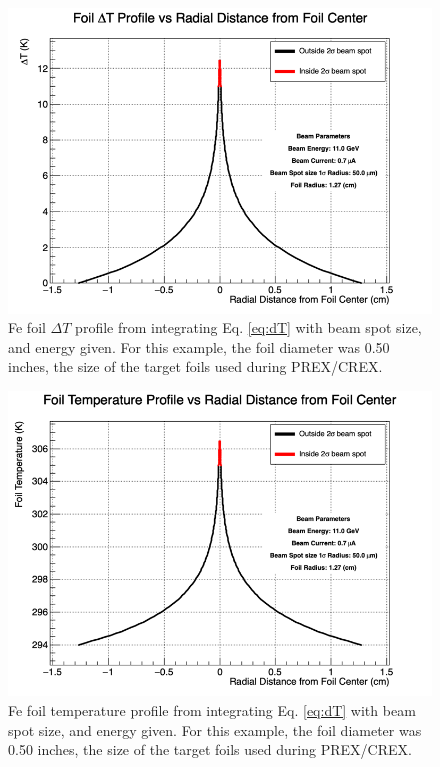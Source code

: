 \documentclass[12pt]{article}
\begin{document}
\begin{figure}[h]
\centering
\includegraphics[width=0.9\linewidth]{FoilHeatingdT.png}
\caption{\label{fig:foilheating}Fe foil $\Delta T$ profile from integrating Eq. \ref{eq:dT} with beam spot size, and energy given. For this example, the foil diameter was 0.50 inches, the size of the target foils used during PREX/CREX.}
\end{figure}
\begin{figure}[h]
\centering
\includegraphics[width=0.9\linewidth]{FoilHeatingT.png}
\caption{\label{fig:foilheatingT}Fe foil temperature profile from integrating Eq. \ref{eq:dT} with beam spot size, and energy given. For this example, the foil diameter was 0.50 inches, the size of the target foils used during PREX/CREX.}
\end{figure}

\FloatBarrier
\newpage
\end{document}
